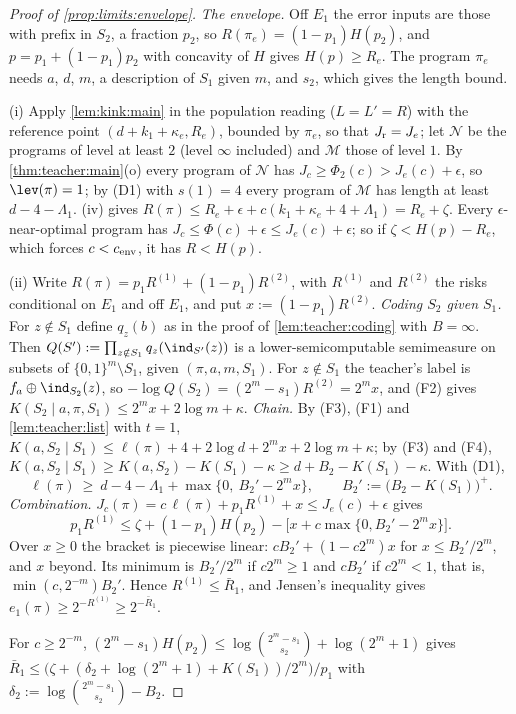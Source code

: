 \begin{proof}[Proof of \cref{prop:limits:envelope}]
\emph{The envelope.} Off $E_1$ the error inputs are those with prefix in $S_2$, a fraction $p_2$, so $R(\pi_e)=(1-p_1)H(p_2)$, and $p=p_1+(1-p_1)p_2$ with concavity of $H$ gives $H(p)\ge R_e$. The program $\pi_e$ needs $a$, $d$, $m$, a description of $S_1$ given $m$, and $s_2$, which gives the length bound.

(i) Apply \cref{lem:kink:main} in the population reading ($L=L'=R$) with the reference point $(d+k_1+\kappa_e,R_e)$, bounded by $\pi_e$, so that $J_{\rm r}=J_e$; let $\mathcal N$ be the programs of level at least $2$ (level $\infty$ included) and $\mathcal M$ those of level $1$. By \cref{thm:teacher:main}(o) every program of $\mathcal N$ has $J_c\ge\Phi_2(c)>J_e(c)+\epsilon$, so $\lev(\pi)=1$; by (D1) with $s(1)=4$ every program of $\mathcal M$ has length at least $d-4-\Lambda_1$. (iv) gives $R(\pi)\le R_e+\epsilon+c(k_1+\kappa_e+4+\Lambda_1)=R_e+\zeta$. Every $\epsilon$-near-optimal program has $J_c\le\Phi(c)+\epsilon\le J_e(c)+\epsilon$; so if $\zeta<H(p)-R_e$, which forces $c<c_{\rm env}$, it has $R<H(p)$.

(ii) Write $R(\pi)=p_1R^{(1)}+(1-p_1)R^{(2)}$, with $R^{(1)}$ and $R^{(2)}$ the risks conditional on $E_1$ and off $E_1$, and put $x:=(1-p_1)R^{(2)}$. \emph{Coding $S_2$ given $S_1$.} For $z\notin S_1$ define $q_z(b)$ as in the proof of \cref{lem:teacher:coding} with $B=\infty$. Then $Q(S'):=\prod_{z\notin S_1}q_z(\ind_{S'}(z))$ is a lower-semicomputable semimeasure on subsets of $\{0,1\}^m\setminus S_1$, given $(\pi,a,m,S_1)$. For $z\notin S_1$ the teacher's label is $f_a\oplus\ind_{S_2}(z)$, so $-\log Q(S_2)=(2^m-s_1)R^{(2)}=2^mx$, and (F2) gives $K(S_2\mid a,\pi,S_1)\le2^mx+2\log m+\kappa$. \emph{Chain.} By (F3), (F1) and \cref{lem:teacher:list} with $t=1$, $K(a,S_2\mid S_1)\le\ell(\pi)+4+2\log d+2^mx+2\log m+\kappa$; by (F3) and (F4), $K(a,S_2\mid S_1)\ge K(a,S_2)-K(S_1)-\kappa\ge d+B_2-K(S_1)-\kappa$. With (D1),
\[
\ell(\pi)\ \ge\ d-4-\Lambda_1+\max\big\{0,\ B_2'-2^mx\big\},\qquad B_2':=\big(B_2-K(S_1)\big)^+ .
\]
\emph{Combination.} $J_c(\pi)=c\,\ell(\pi)+p_1R^{(1)}+x\le J_e(c)+\epsilon$ gives
\[
p_1R^{(1)}\le\zeta+(1-p_1)H(p_2)-\big[x+c\max\{0,B_2'-2^mx\}\big].
\]
Over $x\ge0$ the bracket is piecewise linear: $cB_2'+(1-c2^m)x$ for $x\le B_2'/2^m$, and $x$ beyond. Its minimum is $B_2'/2^m$ if $c2^m\ge1$ and $cB_2'$ if $c2^m<1$, that is, $\min(c,2^{-m})B_2'$. Hence $R^{(1)}\le\bar R_1$, and Jensen's inequality gives $e_1(\pi)\ge2^{-R^{(1)}}\ge2^{-\bar R_1}$.

For $c\ge2^{-m}$, $(2^m-s_1)H(p_2)\le\log\binom{2^m-s_1}{s_2}+\log(2^m+1)$ gives $\bar R_1\le\big(\zeta+(\delta_2+\log(2^m+1)+K(S_1))/2^m\big)/p_1$ with $\delta_2:=\log\binom{2^m-s_1}{s_2}-B_2$.
\end{proof}

